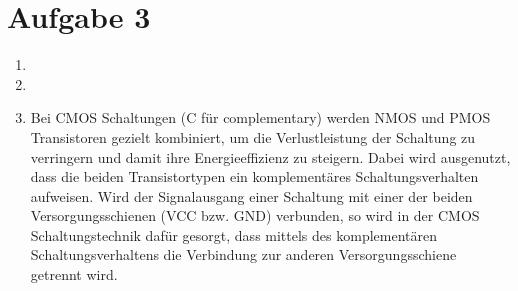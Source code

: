 \documentclass[a4paper]{article}
\begin{document}
\section*{Aufgabe 3}
\begin{enumerate}[label=\alph*)]
	\item 
	\item 
	\item Bei CMOS Schaltungen (C für complementary) werden NMOS und PMOS Transistoren gezielt kombiniert, um die Verlustleistung der Schaltung zu verringern und damit ihre Energieeffizienz zu steigern. Dabei wird ausgenutzt, dass die beiden Transistortypen ein komplementäres Schaltungsverhalten aufweisen. Wird der Signalausgang einer Schaltung mit einer der beiden Versorgungsschienen (VCC bzw. GND) verbunden, so wird in der CMOS Schaltungstechnik dafür gesorgt, dass mittels des komplementären Schaltungsverhaltens die Verbindung zur anderen Versorgungsschiene getrennt wird. 
\end{enumerate}
\end{document}
